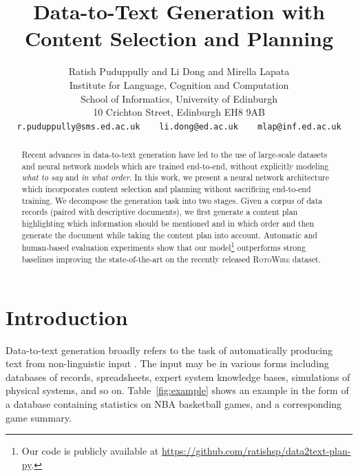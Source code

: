 \documentclass[letterpaper]{article} \usepackage{aaai19}  \usepackage{times}  \usepackage{helvet}  \usepackage{courier}  \usepackage{url}  \usepackage{graphicx}  \frenchspacing  \setlength{\pdfpagewidth}{8.5in}  \setlength{\pdfpageheight}{11in}  \graphicspath{ {images/} }
\begin{document}
\title{Data-to-Text Generation with Content Selection and Planning}
\author{Ratish Puduppully  \textnormal{and} Li Dong \textnormal{and} Mirella Lapata\\
Institute for Language, Cognition and Computation\\
School of Informatics, University of Edinburgh\\
 10 Crichton Street, Edinburgh EH8 9AB\\
\texttt{r.puduppully@sms.ed.ac.uk}~~~~\texttt{li.dong@ed.ac.uk}~~~~\texttt{mlap@inf.ed.ac.uk}\\
}
 
\maketitle
\begin{abstract}


  Recent advances in data-to-text generation have led to the use of
  large-scale datasets and neural network models which are trained
  end-to-end, without explicitly modeling \emph{what to say} and
  \emph{in what order}. In this work, we present a neural network
  architecture which incorporates content selection and planning
  without sacrificing end-to-end training. We decompose the generation
  task into two stages. Given a corpus of data records (paired with
  descriptive documents), we first generate a content plan
  highlighting which information should be mentioned and in which
  order and then generate the document while taking the content plan
  into account. Automatic and human-based evaluation experiments show
  that our model\footnote{Our code is publicly available at
    \url{https://github.com/ratishsp/data2text-plan-py}.} outperforms strong baselines improving the
  state-of-the-art on the recently released \textsc{RotoWire} dataset.

\end{abstract}
\section{Introduction}
Data-to-text generation broadly refers to the task of automatically
producing text from non-linguistic input
\cite{reiter-dale:00,gatt2018survey}. The input may be in various forms
including databases of records, spreadsheets, expert system knowledge bases,
simulations of physical systems, and so on. Table~\ref{fig:example}
shows an example in the form of a database containing statistics on
NBA basketball games, and a corresponding game summary.
\end{document}
